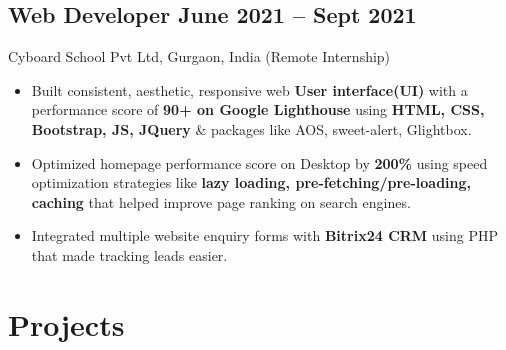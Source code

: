 \documentclass[a4,10pt]{article}
\newcommand{\subtext}[1]{
#1\par\vspace{-0.2cm}}
\newenvironment{zitemize}{
\begin{itemize}\itemsep0pt \parskip0pt \parsep1pt}
{\end{itemize}\vspace{-0.5cm}}
\begin{document}
\subsection*{Web Developer \hfill June 2021 -- Sept 2021} 
\subtext{Cyboard School Pvt Ltd, Gurgaon, India {\normalsize\normalfont (Remote Internship) }}
    \begin{zitemize}
        \item Built consistent, aesthetic, responsive web \textbf{User interface(UI)} with a performance score of \textbf{90+ on Google Lighthouse}
        using \textbf{HTML, CSS, Bootstrap, JS, JQuery} \& packages like AOS, sweet-alert, Glightbox. 
        \item Optimized homepage performance score on Desktop by \textbf{200\%} using speed optimization strategies like \textbf{lazy loading, pre-fetching/pre-loading, caching} that helped improve page ranking on search engines.
        \item Integrated multiple website enquiry forms with \textbf{Bitrix24 CRM} using PHP that made tracking leads easier.
    \end{zitemize}





\section{Projects} %



\end{document}
